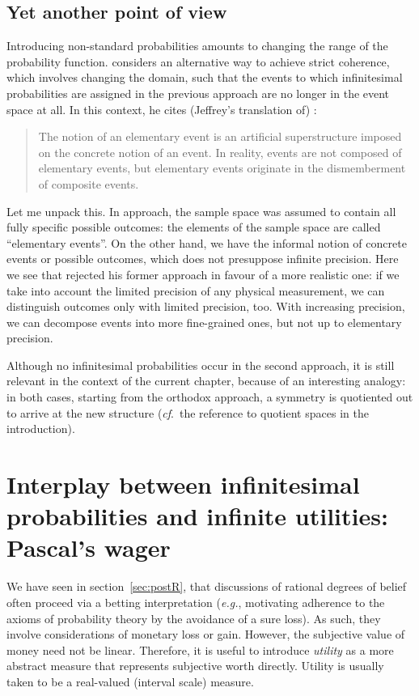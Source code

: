 \subsection{Yet another point of view}
Introducing non-standard probabilities amounts to changing the range of the probability function. \citet{Skyrms:1995} considers an alternative way to achieve strict coherence, which involves changing the domain, such that the events to which infinitesimal probabilities are assigned in the previous approach are no longer in the event space at all.
In this context, he cites (Jeffrey's translation of) \citet{Kolmogorov:1948}:
\begin{quote}
The notion of an elementary event is an artificial superstructure imposed on the concrete notion of an event. In reality, events are not composed of elementary events, but elementary events originate in the dismemberment of composite events.
\end{quote}
Let me unpack this. In  approach, the sample space was assumed to contain all fully specific possible outcomes: the elements of the sample space are called ``elementary events''. On the other hand, we have the informal notion of concrete events or possible outcomes, which does not presuppose infinite precision. Here we see that \citet{Kolmogorov:1948} rejected his former approach in favour of a more realistic one: if we take into account the limited precision of any physical measurement, we can distinguish outcomes only with limited precision, too. With increasing precision, we can decompose events into more fine-grained ones, but not up to elementary precision.

Although no infinitesimal probabilities occur in the second approach, it is still relevant in the context of the current chapter, because of an interesting analogy: in both cases, starting from the orthodox approach, a symmetry is quotiented out to arrive at the new structure (\textit{cf}.\ the reference to quotient spaces in the introduction).

\section[Infinitesimal Probability and Infinite utility]{Interplay between infinitesimal probabilities and infinite utilities: Pascal's wager}\label{sec:pascalswager}


We have seen in section~\ref{sec:postR}, that discussions of rational degrees of belief often proceed via a betting interpretation (\textit{e.g.}, motivating adherence to the axioms of probability theory by the avoidance of a sure loss). As such, they involve considerations of monetary loss or gain. However, the subjective value of money need not be linear. Therefore, it is useful to introduce \textit{utility} as a more abstract measure that represents subjective worth directly. Utility is usually taken to be a real-valued (interval scale) measure.

